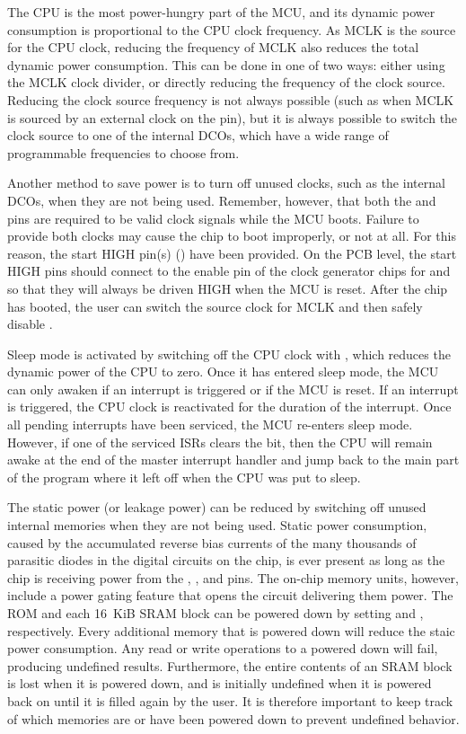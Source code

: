 The CPU is the most power-hungry part of the MCU, and its dynamic power consumption is proportional to the CPU clock frequency. As MCLK is the source for the CPU clock, reducing the frequency of MCLK also reduces the total dynamic power consumption. This can be done in one of two ways: either using the MCLK clock divider, or directly reducing the frequency of the clock source. Reducing the clock source frequency is not always possible (such as when MCLK is sourced by an external clock on the  pin), but it is always possible to switch the clock source to one of the internal DCOs, which have a wide range of programmable frequencies to choose from.

Another method to save power is to turn off unused clocks, such as the internal DCOs, when they are not being used. Remember, however, that both the  and  pins are required to be valid clock signals while the MCU boots. Failure to provide both clocks may cause the chip to boot improperly, or not at all. For this reason, the start HIGH pin(s) () have been provided. On the PCB level, the start HIGH pins should connect to the enable pin of the clock generator chips for  and  so that they will always be driven HIGH when the MCU is reset. After the chip has booted, the user can switch the source clock for MCLK and then safely disable .

Sleep mode is activated by switching off the CPU clock with , which reduces the dynamic power of the CPU to zero. Once it has entered sleep mode, the MCU can only awaken if an interrupt is triggered or if the MCU is reset. If an interrupt is triggered, the CPU clock is reactivated for the duration of the interrupt. Once all pending interrupts have been serviced, the MCU re-enters sleep mode. However, if one of the serviced ISRs clears the  bit, then the CPU will remain awake at the end of the master interrupt handler and jump back to the main part of the program where it left off when the CPU was put to sleep.

The static power (or leakage power) can be reduced by switching off unused internal memories when they are not being used. Static power consumption, caused by the accumulated reverse bias currents of the many thousands of parasitic diodes in the digital circuits on the chip, is ever present as long as the chip is receiving power from the , , and  pins. The on-chip memory units, however, include a power gating feature that opens the circuit delivering them power. The ROM and each 16~KiB SRAM block can be powered down by setting  and , respectively. Every additional memory that is powered down will reduce the staic power consumption. Any read or write operations to a powered down will fail, producing undefined results. Furthermore, the entire contents of an SRAM block is lost when it is powered down, and is initially undefined when it is powered back on until it is filled again by the user. It is therefore important to keep track of which memories are or have been powered down to prevent undefined behavior.

